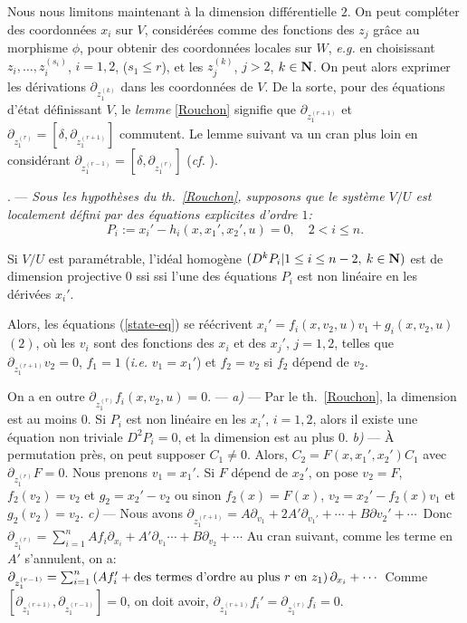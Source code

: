 \documentclass[A4paper, 12pt]{article}
\def\N{{\bf N}}
\def\bull{\vrule height .9ex width .8ex depth -.1ex }
\def\textem#1{{\em #1\/}}
\newcounter{thenum}
\newenvironment{lemma}{\medbreak\refstepcounter{thenum}\noindent{\it Lemma} %
\thethenum. ---  \it  }{\rm }
\newenvironment{preuve}{\smallbreak\noindent{\sc Preuve.} ---
  \rm}{\quad\bull\smallskip\rm}
\begin{document}
Nous nous limitons maintenant à la dimension différentielle $2$.
On peut compléter des coordonnées $x_{i}$ sur $V$, considérées comme
des fonctions des $z_{j}$ grâce au morphisme $\phi$, pour obtenir des
coordonnées locales sur
$W$, \textit{e.g.} en choisissant $z_{i}, \ldots, z_{i}^{(s_{i})}$, $i=1,2$,
($s_{1}\le r$), et les $z_{j}^{(k)}$, $j>2$, $k\in\N$. On peut alors
exprimer les dérivations $\partial_{z_{1}^{(k)}}$ dans les coordonnées
de $V$. De la sorte, pour des équations d'état définissant $V$,
le \textit{lemme} \ref{Rouchon} signifie que $\partial_{z_{1}^{(r+1)}}$ et
$\partial_{z_{1}^{(r)}}=[\delta,\partial_{z_{1}^{(r+1)}}]$
commutent. Le lemme suivant va un cran plus loin en considérant
$\partial_{z_{1}^{(r-1)}}=[\delta,\partial_{z_{1}^{(r)}}]$
(\textit{cf.} \cite{zharinov1996}).

\begin{lemma}\label{Rouchon2} Sous les hypothèses du
  th.~\ref{Rouchon}, supposons que
  le système $V/U$ est localement défini par des équations explicites
  d'ordre 
  $1$:  
\begin{equation}\label{state-eq}
P_{i}:=x_{i}'-h_{i}(x,x_{1}',x_{2}',u)=0,\quad 2< i\le n.
\end{equation}

\noindent \textem{a)} Si $V/U$ est paramétrable, l'idéal homogène
  $(D^{k}P_{i}|1\le i\le n-2,\> k\in\N)$ est de dimension projective $0$ ssi
  ssi l'une des équations $P_{i}$ est non linéaire en les dérivées
  $x_{i}'$.

\noindent \textem{b)} Alors, les équations (\ref{state-eq}) se réécrivent
$x_{i}'=f_{i}(x,v_{2},u)v_{1}+g_{i}(x,v_{2},u)$ $(2)$, où les $v_{i}$ sont
des fonctions des $x_{i}$ et des $x_{j}'$, $j=1,2$, telles que
$\partial_{z_{1}^{(r+1)}}v_{2}=0$, $f_{1}=1$ (\textem{i.e.}
$v_{1}=x_{1}'$) et $f_{2}=v_{2}$ si $f_{2}$ dépend de $v_{2}$.

\noindent \textem{c)} On a en outre $\partial_{z_{1}^{(r)}}f_{i}(x,v_{2},u)=0$.
\end{lemma}
\begin{preuve} \textem{a)} --- Par le th.~\ref{Rouchon}, la dimension
  est au moins $0$. Si $P_{i}$ est non linéaire en les $x_{i}'$,
  $i=1,2$, alors il existe une  équation non triviale
  $D^{2}P_{i}=0$, et la dimension est au plus $0$.
  \textem{b)} --- À permutation près, on peut supposer
  $C_{1}\neq0$. Alors, $C_{2}=F(x,x_{1}',x_{2}')C_{1}$ avec
  $\partial_{z_{1}^{(r)}}F=0$. Nous prenons $v_{1}=x_{1}'$. Si $F$ dépend
  de $x_{2}'$, on pose $v_{2}=F$, $f_{2}(v_{2})=v_{2}$ et
  $g_{2}=x_{2}'-v_{2}$ ou sinon
  $f_{2}(x)=F(x)$, $v_{2}=x_{2}'-f_{2}(x)v_{1}$
  et $g_{2}(v_{2})=v_{2}$. \textem{c)} --- Nous avons
$\partial_{z_{1}^{(r+1)}}=A\partial_{v_{1}}+2A'\partial_{v_{1}'}+\cdots+B\partial
v_{2}'+\cdots$\ 
Donc
$\partial_{z_{1}^{(r)}}=\sum_{i=1}^{n}Af_{i}\partial_{x_{i}}+
A'\partial_{v_{1}}\cdots+B\partial_{v_{2}}+\cdots$  
Au cran suivant, comme les terme en $A'$ s'annulent, on a: 
$\partial_{z_{1}^{(r-1)}}=\sum_{i=1}^{n}\left(Af_{i}'+
\hbox{des termes d'ordre au plus $r$ en $z_{1}$}\right)\partial_{x_{i}}+\cdots$
Comme $[\partial_{z_{1}^{(r+1)}},\partial_{z_{1}^{(r-1)}}]=0$, on doit
avoir, $\partial_{z_{1}^{(r+1)}}f_{i}'=\partial_{z_{1}^{(r)}}f_{i}=0$. 
\end{preuve}
\end{document}
